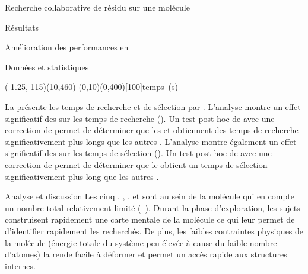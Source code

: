 \documentclass[myfrancais,ngerman,english,frenchb]{mythesis}
\begin{document}
\begin{mychapter}{Recherche collaborative de résidu sur une molécule}
\begin{mysection}{Résultats}
\begin{mysubsection}{Amélioration des performances en }
\begin{mysubsubsection}{Données et statistiques}
					\begin{myfigure}
						\begin{myps}(-1.25,-115)(10,460)
							\myaxes(0,10){}(0,400)[100]{temps~(s)}
						\end{myps}
					\end{myfigure}

					La  présente les temps de recherche et de sélection par  .
					L'analyse montre un effet significatif des   sur les temps de recherche ().
					Un test post-hoc de  avec une correction de  permet de déterminer que les   et  obtiennent des temps de recherche significativement plus longs que les autres .
					L'analyse montre également un effet significatif des   sur les temps de sélection ().
					Un test post-hoc de  avec une correction de  permet de déterminer que le   obtient un temps de sélection significativement plus long que les autres .
				\end{mysubsubsection}
				\begin{mysubsubsection}{Analyse et discussion}
					Les cinq  , , ,  et  sont au sein de la molécule \myTRPCAGE qui en compte un nombre total relativement limité (~).
					Durant la phase d'exploration, les sujets construisent rapidement une carte mentale de la molécule ce qui leur permet de d'identifier rapidement les  recherchés.
					De plus, les faibles contraintes physiques de la molécule (énergie totale du système peu élevée à cause du faible nombre d'atomes) la rende facile à déformer et permet un accès rapide aux structures internes.

\end{mysubsubsection}
\end{mysubsection}
\end{mysection}
\end{mychapter}
\end{document}
